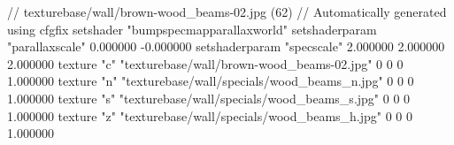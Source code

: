 // texturebase/wall/brown-wood_beams-02.jpg (62)
// Automatically generated using cfgfix
setshader "bumpspecmapparallaxworld"
setshaderparam "parallaxscale" 0.000000 -0.000000
setshaderparam "specscale" 2.000000 2.000000 2.000000
texture "c" "texturebase/wall/brown-wood_beams-02.jpg" 0 0 0 1.000000
texture "n" "texturebase/wall/specials/wood_beams_n.jpg" 0 0 0 1.000000
texture "s" "texturebase/wall/specials/wood_beams_s.jpg" 0 0 0 1.000000
texture "z" "texturebase/wall/specials/wood_beams_h.jpg" 0 0 0 1.000000
